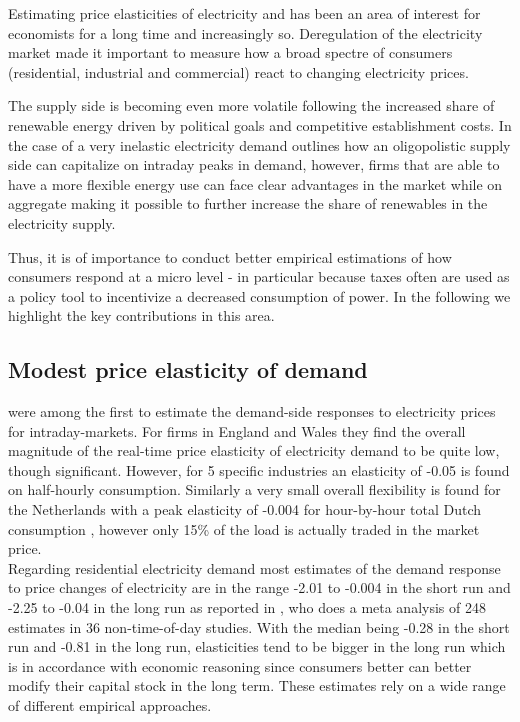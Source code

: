 \label{sec:background}
Estimating price elasticities of electricity and has been an area of interest for economists for a long time and increasingly so. Deregulation of the electricity market made it important to measure how a broad spectre of consumers (residential, industrial and commercial) react to changing electricity prices.


The supply side is becoming even more volatile following the increased share of renewable energy driven by political goals and competitive establishment costs. In the case of a very inelastic electricity demand \citet{wolak2001impact} outlines how an oligopolistic supply side can capitalize on intraday peaks in demand, however, firms that are able to have a more flexible energy use can face clear advantages in the market while on aggregate making it possible to further increase the share of renewables in the electricity supply. \par
Thus, it is of importance to conduct better empirical estimations of how consumers respond at a micro level - in particular because taxes often are used as a policy tool to incentivize a decreased consumption of power. In the following we highlight the key contributions in this area.

\subsection{Modest price elasticity of demand}
\label{subsec:b_results}
\citet{patrick2001estimating} were among the first to estimate the demand-side responses to electricity prices for intraday-markets. For firms in England and Wales they find the overall magnitude of the real-time price elasticity of electricity demand to be quite low, though significant. However, for 5 specific industries an elasticity of -0.05 is found on half-hourly consumption. Similarly a very small overall flexibility is found for the Netherlands with a peak elasticity of -0.004 for hour-by-hour total Dutch consumption \citet{lijesen2007real}, however only 15\% of the load is actually traded in the market price.
\medskip\\
Regarding residential electricity demand most estimates of the demand response to price changes of electricity are in the range -2.01 to -0.004 in the short run and -2.25 to -0.04 in the long run as reported in \citet{espey2004turning}, who does a meta analysis of 248 estimates in 36 non-time-of-day studies. With the median being -0.28 in the short run and -0.81 in the long run, elasticities tend to be bigger in the long run which is in accordance with economic reasoning since consumers better can better modify their capital stock in the long term. These estimates rely on a wide range of different empirical approaches.

